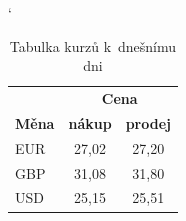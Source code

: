 \documentclass[a4paper,11pt]{article}
\begin{document}
	
	\begin{table}[ht]
		\begin{center}
			\catcode`
			\begin{tabular}{ |l|c|c| } 
				\hline
				&\multicolumn{2}{c|}{\textbf{Cena}}\\ \cline{2-3}
				\textbf{Měna} & \textbf{nákup} & \textbf{prodej}\\
				\hline
				EUR & 27,02 & 27,20 \\ 
				GBP & 31,08 & 31,80 \\ 
				USD & 25,15 & 25,51 \\ 
				\hline
			\end{tabular}
			\caption{Tabulka kurzů k~dnešnímu dni}
			\label{tab:tabulka1}
		\end{center}
	\end{table}
	
\end{document}
